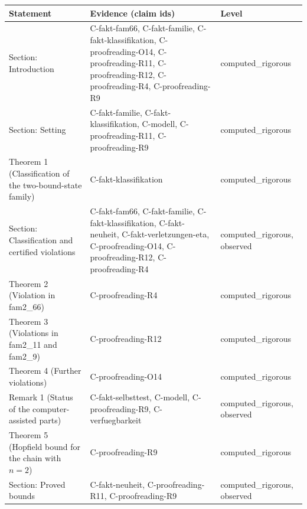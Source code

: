\documentclass[10pt,twocolumn]{article}
\theoremstyle{definition}\newtheorem{definition}{Definition}\newtheorem{example}{Example}
\begin{document}
{\def\LTcaptype{none} %
\begin{table}[t]\centering\footnotesize
\begin{tabular}{@{}
  >{\raggedright\arraybackslash}p{}
  >{\raggedright\arraybackslash}p{}
  >{\raggedright\arraybackslash}p{}@{}}
\toprule
\begin{minipage}[b]{\linewidth}\raggedright
Statement
\end{minipage} & \begin{minipage}[b]{\linewidth}\raggedright
Evidence (claim ids)
\end{minipage} & \begin{minipage}[b]{\linewidth}\raggedright
Level
\end{minipage} \\
\midrule
Section: Introduction & C-fakt-fam66, C-fakt-familie, C-fakt-klassifikation, C-proofreading-O14, C-proofreading-R11, C-proofreading-R12, C-proofreading-R4, C-proofreading-R9 & computed\_rigorous \\
Section: Setting & C-fakt-familie, C-fakt-klassifikation, C-modell, C-proofreading-R11, C-proofreading-R9 & computed\_rigorous \\
Theorem 1 (Classification of the two-bound-state family) & C-fakt-klassifikation & computed\_rigorous \\
Section: Classification and certified violations & C-fakt-fam66, C-fakt-familie, C-fakt-klassifikation, C-fakt-neuheit, C-fakt-verletzungen-eta, C-proofreading-O14, C-proofreading-R12, C-proofreading-R4 & computed\_rigorous, observed \\
Theorem 2 (Violation in fam2\_66) & C-proofreading-R4 & computed\_rigorous \\
Theorem 3 (Violations in fam2\_11 and fam2\_9) & C-proofreading-R12 & computed\_rigorous \\
Theorem 4 (Further violations) & C-proofreading-O14 & computed\_rigorous \\
Remark 1 (Status of the computer-assisted parts) & C-fakt-selbsttest, C-modell, C-proofreading-R9, C-verfuegbarkeit & computed\_rigorous, observed \\
Theorem 5 (Hopfield bound for the chain with \(n=2\)) & C-proofreading-R9 & computed\_rigorous \\
Section: Proved bounds & C-fakt-neuheit, C-proofreading-R11, C-proofreading-R9 & computed\_rigorous, observed \\

\end{tabular}
\end{table}}
\end{document}
